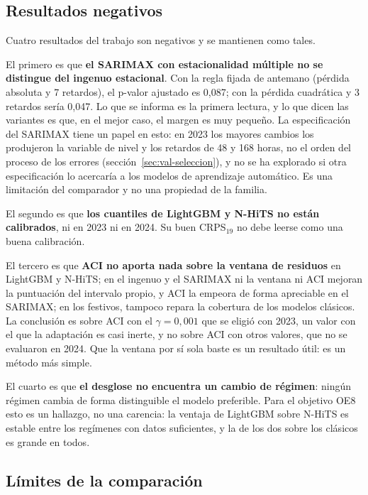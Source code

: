 \subsection{Resultados negativos}\label{sec:disc-negativos}

Cuatro resultados del trabajo son negativos y se mantienen como tales.

El primero es que \textbf{el SARIMAX con estacionalidad múltiple no se distingue
del ingenuo estacional}. Con la regla fijada de antemano (pérdida absoluta y 7
retardos), el p-valor ajustado es 0,087; con la pérdida cuadrática y 3 retardos
sería 0,047. Lo que se informa es la primera lectura, y lo que dicen las
variantes es que, en el mejor caso, el margen es muy pequeño. La especificación
del SARIMAX tiene un papel en esto: en 2023 los mayores cambios los produjeron
la variable de nivel y los retardos de 48 y 168 horas, no el orden del proceso
de los errores (sección~\ref{sec:val-seleccion}), y no se ha explorado si otra
especificación lo acercaría a los modelos de aprendizaje automático. Es una
limitación del comparador y no una propiedad de la familia.

El segundo es que \textbf{los cuantiles de LightGBM y N-HiTS no están
calibrados}, ni en 2023 ni en 2024. Su buen CRPS$_{19}$ no debe leerse como una
buena calibración.

El tercero es que \textbf{ACI no aporta nada sobre la ventana de residuos} en
LightGBM y N-HiTS; en el ingenuo y el SARIMAX ni la ventana ni ACI mejoran la
puntuación del intervalo propio, y ACI la empeora de forma apreciable en el
SARIMAX; en los festivos, tampoco repara la cobertura de los modelos
clásicos. La conclusión es sobre ACI \parencite{gibbs2021adaptive} con el
$\gamma = 0{,}001$ que se eligió con 2023, un valor con el que la adaptación es
casi inerte, y no sobre ACI con otros valores, que no se evaluaron en 2024. Que la
ventana por sí sola baste es un resultado útil: es un método más simple.

El cuarto es que \textbf{el desglose no encuentra un cambio de régimen}: ningún
régimen cambia de forma distinguible el modelo preferible. Para el objetivo OE8
esto es un hallazgo, no una carencia: la ventaja de LightGBM sobre N-HiTS es
estable entre los regímenes con datos suficientes, y la de los dos sobre los
clásicos es grande en todos.

\subsection{Límites de la comparación}\label{sec:disc-limites}

